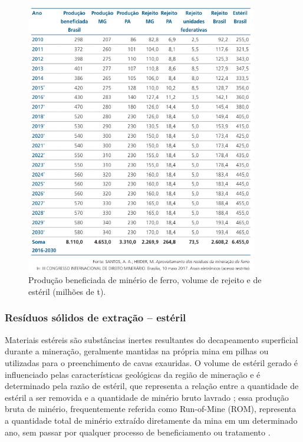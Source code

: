 \begin{figure}[!htb]
    \centering
    \includegraphics[width=0.9\textwidth]{figures/image17_producao_minerio.png}
    \caption{Produção beneficiada de minério de ferro, volume de rejeito e de estéril (milhões de t).}
    \label{fig:producao_minerio}
\end{figure}

\subsubsection{Resíduos sólidos de extração -- estéril}
\label{subsubsec:esteril}

Materiais estéreis são substâncias inertes resultantes do decapeamento
superficial durante a mineração, geralmente mantidas na própria mina em
pilhas ou utilizadas para o preenchimento de cavas exauridas. O volume
de estéril gerado é influenciado pelas características geológicas da
região de mineração e é determinado pela razão de estéril, que
representa a relação entre a quantidade de estéril a ser removida e a
quantidade de minério bruto lavrado \cite[p.359]{carvalho2018sustentabilidade};
essa produção bruta de minério, frequentemente referida como Run-of-Mine
(ROM), representa a quantidade total de minério extraído diretamente da
mina em um determinado ano, sem passar por qualquer processo de
beneficiamento ou tratamento \cite{anm2022anuario}.

